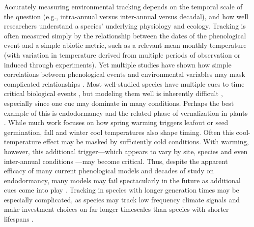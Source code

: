 \documentclass[11pt,letterpaper]{article}
\begin{document}
Accurately measuring environmental tracking depends on the temporal scale of the question (e.g., intra-annual versus inter-annual versus decadal), and how well researchers understand a species' underlying physiology and ecology. Tracking is often measured simply by the relationship between the dates of the phenological event and a simple abiotic metric, such as a relevant mean monthly temperature (with variation in temperature derived from multiple periods of observation or induced through experiments).  Yet multiple studies have shown how simple correlations between phenological events and environmental variables may mask complicated relationships \citep{Cook:2012pnas,thackeray2016,tansey2017}. Most well-studied species have multiple cues to time critical biological events \citep{chuinearees}, but modeling them well is inherently difficult \citep{chuine2016}, especially since one cue may dominate in many conditions. Perhaps the best example of this is endodormancy and the related phase of vernalization in plants \citep{chuine2016,Burghardt2015}. While much work focuses on how spring warming triggers leafout or seed germination, fall and winter cool temperatures also shape timing. Often this cool-temperature effect may be masked by sufficiently cold conditions. With warming, however, this additional trigger---which appears to vary by site, species and even inter-annual conditions \citep{Burghardt2015}---may become critical. Thus, despite the apparent efficacy of many current phenological models and decades of study on endodormancy, many models may fail spectacularly in the future as additional cues come into play \citep{dennis2003,chuine2016}. Tracking in species with longer generation times may be especially complicated, as species may track low frequency climate signals and make investment choices on far longer timescales than species with shorter lifespans \citep{morris2008}. 
\end{document}
